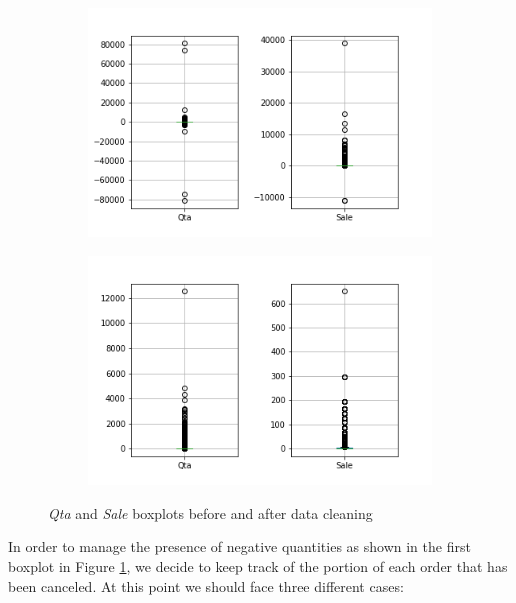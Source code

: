 \begin{figure}
\begin{subfigure}{.49\textwidth}
\centering
\includegraphics[width=.95\textwidth]{img/understanding/boxplots_before.png}
\caption{}
\label{fig:sale_qta_boxplots_before}
\end{subfigure}
\begin{subfigure}{.49\textwidth}
\centering
\captionsetup{justification=centering}
\includegraphics[width=.95\textwidth]{img/understanding/boxplots_after.png}
\caption{}
\label{fig:sale_qta_boxplots_after}
\end{subfigure}
\caption{\emph{Qta} and \emph{Sale} boxplots before and after data cleaning}
\end{figure}

In order to manage the presence of negative quantities as shown in the first boxplot in Figure \ref{fig:sale_qta_boxplots_before}, we decide to keep track of the portion of each order that has been canceled. At this point we should face three different cases:

